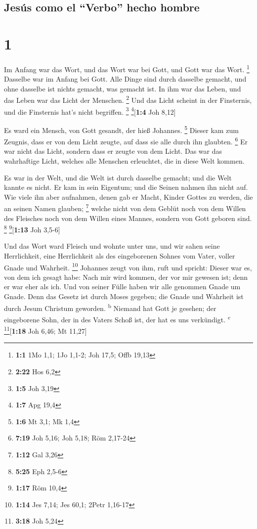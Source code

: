 \hypertarget{jesuxfas-como-el-verbo-hecho-hombre}{%
\subsection{Jesús como el ``Verbo'' hecho
hombre}\label{jesuxfas-como-el-verbo-hecho-hombre}}

\hypertarget{section}{%
\section{1}\label{section}}

 Im Anfang war das Wort, und das Wort war bei Gott, und
Gott war das Wort. \footnote{\textbf{1:1} 1Mo 1,1; 1Jo 1,1-2; Joh 17,5;
  Offb 19,13}  Dasselbe war im Anfang bei Gott.
 Alle Dinge sind durch dasselbe gemacht, und ohne dasselbe
ist nichts gemacht, was gemacht ist.  In ihm war das
Leben, und das Leben war das Licht der Menschen. \footnote{\textbf{2:22}
  Hos 6,2}  Und das Licht scheint in der Finsternis, und
die Finsternis hat's nicht begriffen. \footnote{\textbf{1:5} Joh 3,19}
\footnote{\textbf{1:7} Apg 19,4}{[}\textbf{1:4} Joh 8,12{]}

 Es ward ein Mensch, von Gott gesandt, der hieß Johannes.
\footnote{\textbf{1:6} Mt 3,1; Mk 1,4}  Dieser kam zum
Zeugnis, dass er von dem Licht zeugte, auf dass sie alle durch ihn
glaubten. \footnote{\textbf{7:19} Joh 5,16; Joh 5,18; Röm 2,17-24}
 Er war nicht das Licht, sondern dass er zeugte von dem
Licht.  Das war das wahrhaftige Licht, welches alle
Menschen erleuchtet, die in diese Welt kommen.

 Es war in der Welt, und die Welt ist durch dasselbe
gemacht; und die Welt kannte es nicht.  Er kam in sein
Eigentum; und die Seinen nahmen ihn nicht auf.  Wie viele
ihn aber aufnahmen, denen gab er Macht, Kinder Gottes zu werden, die an
seinen Namen glauben; \footnote{\textbf{1:12} Gal 3,26} 
welche nicht von dem Geblüt noch von dem Willen des Fleisches noch von
dem Willen eines Mannes, sondern von Gott geboren sind. \footnote{\textbf{5:25}
  Eph 2,5-6} \footnote{\textbf{1:17} Röm 10,4}{[}\textbf{1:13} Joh
3,5-6{]}

 Und das Wort ward Fleisch und wohnte unter uns, und wir
sahen seine Herrlichkeit, eine Herrlichkeit als des eingeborenen Sohnes
vom Vater, voller Gnade und Wahrheit. \footnote{\textbf{1:14} Jes 7,14;
  Jes 60,1; 2Petr 1,16-17}  Johannes zeugt von ihm, ruft
und spricht: Dieser war es, von dem ich gesagt habe: Nach mir wird
kommen, der vor mir gewesen ist; denn er war eher als ich.
 Und von seiner Fülle haben wir alle genommen Gnade um
Gnade.  Denn das Gesetz ist durch Moses gegeben; die
Gnade und Wahrheit ist durch Jesum Christum geworden.
\textsuperscript{b}  Niemand hat Gott je gesehen; der
eingeborene Sohn, der in des Vaters Schoß ist, der hat es uns
verkündigt. \textsuperscript{c} \footnote{\textbf{3:18} Joh 5,24}{[}\textbf{1:18}
Joh 6,46; Mt 11,27{]}

